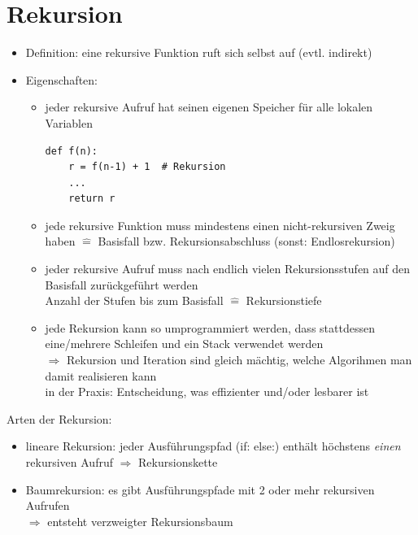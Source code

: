

\chapter{Rekursion}
\begin{itemize}[label={}]
    \item \hspace*{-1cm} Definition: eine rekursive Funktion ruft sich selbst auf (evtl. indirekt)
    \item \hspace*{-1cm} Eigenschaften:
    \begin{itemize}
        \item jeder rekursive Aufruf hat seinen eigenen Speicher für alle lokalen Variablen
        \begin{verbatim}
def f(n):
    r = f(n-1) + 1  # Rekursion
    ...
    return r
        \end{verbatim}
        \item jede rekursive Funktion muss mindestens einen nicht-rekursiven Zweig haben $\widehat{=}$ Basisfall bzw. Rekursionsabschluss (sonst: Endlosrekursion)
        \item jeder rekursive Aufruf muss nach endlich vielen Rekursionsstufen auf den Basisfall zurückgeführt werden \\
        Anzahl der Stufen bis zum Basisfall $\widehat{=}$ Rekursionstiefe
        \item jede Rekursion kann so umprogrammiert werden, dass stattdessen eine/mehrere Schleifen und ein Stack verwendet werden \\
        $\Rightarrow$ Rekursion und Iteration sind gleich mächtig, welche Algorihmen man damit realisieren kann \\
        in der Praxis: Entscheidung, was effizienter und/oder lesbarer ist
    \end{itemize}
\end{itemize}

Arten der Rekursion:
\begin{itemize}
    \item lineare Rekursion: jeder Ausführungspfad (if: else:) enthält höchstens \emph{einen} rekursiven Aufruf $\Rightarrow$ Rekursionskette
    \item Baumrekursion: es gibt Ausführungspfade mit 2 oder mehr rekursiven Aufrufen \\
    $\Rightarrow$ entsteht verzweigter Rekursionsbaum
\end{itemize}

